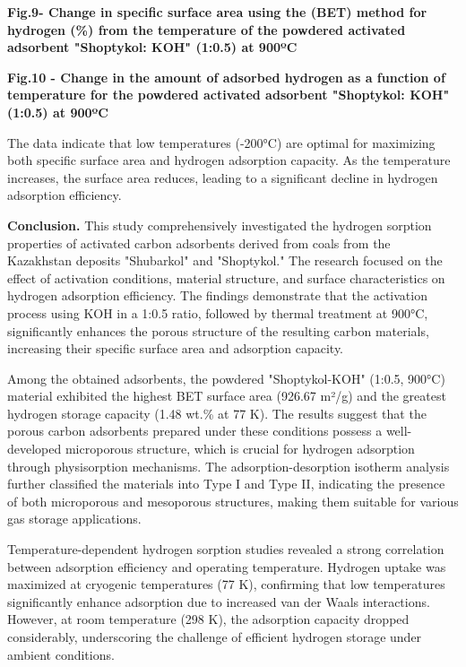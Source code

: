 {\bfseries Fig.9- Change in specific surface area using the (BET) method
for hydrogen (\%) from the temperature of the powdered activated
adsorbent "Shoptykol: KOH" (1:0.5) at 900ºC}

{\bfseries Fig.10 - Change in the amount of adsorbed hydrogen as a function
of temperature for the powdered activated adsorbent "Shoptykol: KOH"
(1:0.5) at 900ºC}

The data indicate that low temperatures (-200°C) are optimal for
maximizing both specific surface area and hydrogen adsorption capacity.
As the temperature increases, the surface area reduces, leading to a
significant decline in hydrogen adsorption efficiency.

{\bfseries Conclusion.} This study comprehensively investigated the
hydrogen sorption properties of activated carbon adsorbents derived from
coals from the Kazakhstan deposits "Shubarkol" and "Shoptykol." The
research focused on the effect of activation conditions, material
structure, and surface characteristics on hydrogen adsorption
efficiency. The findings demonstrate that the activation process using
KOH in a 1:0.5 ratio, followed by thermal treatment at 900°C,
significantly enhances the porous structure of the resulting carbon
materials, increasing their specific surface area and adsorption
capacity.

Among the obtained adsorbents, the powdered "Shoptykol-KOH" (1:0.5,
900°C) material exhibited the highest BET surface area (926.67 m²/g) and
the greatest hydrogen storage capacity (1.48 wt.\% at 77 K). The results
suggest that the porous carbon adsorbents prepared under these
conditions possess a well-developed microporous structure, which is
crucial for hydrogen adsorption through physisorption mechanisms. The
adsorption-desorption isotherm analysis further classified the materials
into Type I and Type II, indicating the presence of both microporous and
mesoporous structures, making them suitable for various gas storage
applications.

Temperature-dependent hydrogen sorption studies revealed a strong
correlation between adsorption efficiency and operating temperature.
Hydrogen uptake was maximized at cryogenic temperatures (77 K),
confirming that low temperatures significantly enhance adsorption due to
increased van der Waals interactions. However, at room temperature (298
K), the adsorption capacity dropped considerably, underscoring the
challenge of efficient hydrogen storage under ambient conditions.

